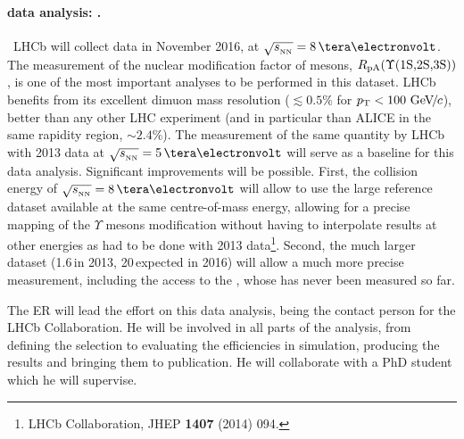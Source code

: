 \documentclass[a4paper,11pt]{article}
\newcommand{\ER}{ER\xspace}
\begin{document}
\paragraph{\pPb data analysis: \PgUabc. }\ 
LHCb will collect \pPb data in November 2016, at $\sqrtsnn = 8\,\TeV$. The measurement of the nuclear modification factor of \PgU mesons, $R_{\text{pA}} (\Upsilon\text{(1S,2S,3S)})$, is one of the most important analyses to be performed in this dataset. LHCb benefits from its excellent dimuon mass resolution ($\lesssim 0.5\%$ for $p_{\text{T}} < 100\,{\,\text{Ge\hspace{-.08em}V\hspace{-0.16em}/\hspace{-0.08em}}c}$), %
better than any other LHC experiment (and in particular than ALICE in the same rapidity region, $\sim 2.4\%$). %
The measurement of the same quantity by LHCb with 2013 \pPb data at $\sqrtsnn = 5\,\TeV$ will serve as a baseline for this data analysis. Significant improvements will be possible. First, the collision energy of $\sqrtsnn = 8\,\TeV$ will allow to use the large \pp reference dataset available at the same centre-of-mass energy, allowing for a precise mapping of the $\Upsilon$ mesons modification without having to interpolate results at other energies as had to be done with 2013 \pPb data\footnote{LHCb Collaboration,
  JHEP {\bf 1407} (2014) 094.
  }.
Second, the much larger dataset (1.6\,\nbinv in 2013, 20\,\nbinv expected in 2016) will allow a much more precise measurement, including the access to the \PgUc, whose \rpa has never been measured so far.

The \ER will lead the effort on this data analysis, being the contact person for the LHCb Collaboration. He will be involved in all parts of the analysis, from defining the selection to evaluating the efficiencies in simulation, producing the results and bringing them to publication. He will collaborate with a PhD student which he will supervise.
\end{document}
